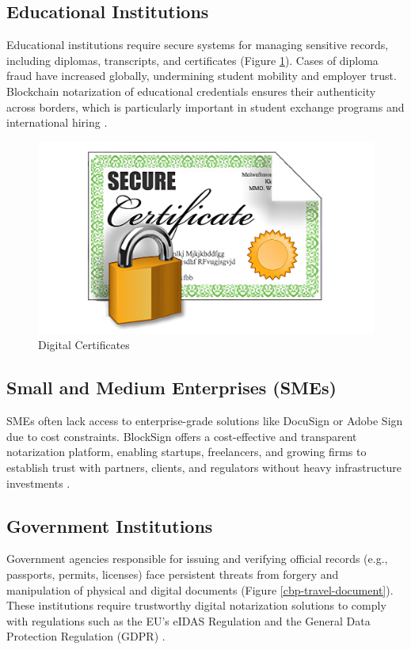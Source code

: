 \subsection{Educational Institutions} 
Educational institutions require secure systems for managing sensitive records, including diplomas, transcripts, and certificates (Figure \ref{digital-certificates}). Cases of diploma fraud have  increased globally, undermining student mobility and employer trust. Blockchain notarization of educational credentials ensures their authenticity across borders, which  is particularly important in student exchange programs and international hiring \cite{unesco_credentials_nodate}.

\begin{figure}[H]
    \centering
    \includegraphics[width=18cm]{"images/digital-certificates.png"}
    \caption{Digital Certificates}
    \label{digital-certificates}
\end{figure}

\subsection{Small and Medium Enterprises (SMEs)} 
SMEs often lack access to enterprise-grade solutions like DocuSign or Adobe Sign due  to cost constraints. BlockSign offers a cost-effective and transparent notarization platform, enabling startups, freelancers, and growing firms to establish trust with partners, clients, and regulators without heavy infrastructure investments \cite{european_comission_digital_nodate}. 

\subsection{Government Institutions} 
Government agencies responsible for issuing and verifying official records (e.g., passports, permits, licenses) face persistent threats from forgery and manipulation of physical and digital documents (Figure \ref{cbp-travel-document}). These institutions require trustworthy digital notarization solutions to comply with regulations such as the EU’s eIDAS Regulation and the General Data Protection Regulation (GDPR) \cite{european_comission_eidas_nodate}. 

